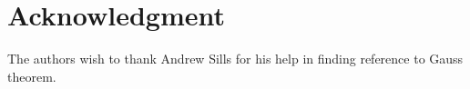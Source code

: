 \documentclass[12pt,a4paper]{amsart}
\begin{document}
\section{Acknowledgment}
The authors wish to thank Andrew Sills for his help in finding reference to Gauss theorem. 



\end{document}

